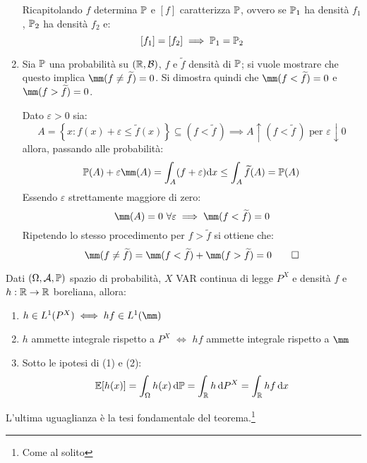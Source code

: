 \begin{dimo}
\begin{enumerate}
      Ricapitolando $f$ determina $\mathbb P$ e $[f]$ caratterizza $\mathbb P$, ovvero se $\mathbb P_1$ ha densità $f_1$, $\mathbb P_2$ ha densità $f_2$ e:
      $$[f_1] = [f_2] \implies \mathbb P_1 = \mathbb P_2$$
    \medskip
    \item Sia $\mathbb P$ una probabilità su $(\mathbb R, \mathcal B)$, $f$ e $\widetilde{f}$ densità di $\mathbb P$;
      si vuole mostrare che questo implica $\mm (f \neq \widetilde{f}) = 0$.
      Si dimostra quindi che $\mm (f < \widetilde{f}) = 0$ e $\mm (f > \widetilde{f}) = 0$.

      Dato $\varepsilon > 0$ sia:
      $$A = \left\{x: f(x)+ \varepsilon \leq \widetilde{f}(x)\right\} \subseteq \left(f < \widetilde{f} \, \right) \implies A \uparrow \left(f  < \widetilde{f} \, \right) \text{ per } \varepsilon \downarrow 0$$
      allora, passando alle probabilità:
      $$\PP(A) + \varepsilon \mm(A) = \int_{A} (f+\varepsilon) \dx \leq \int_{A}  \widetilde{f}(A) = \PP(A)$$
      Essendo $\varepsilon$ strettamente maggiore di zero:
      $$\mm(A) = 0 \ \forall \varepsilon \implies \mm(f < \widetilde{f}) = 0$$
      Ripetendo lo stesso procedimento per $f > \widetilde{f}$ si ottiene che:
      $$\mm(f \neq \widetilde{f}) = \mm(f < \widetilde{f}) + \mm(f > \widetilde{f}) = 0 \qedhere$$
  \end{enumerate}
\end{dimo}

\medskip
\begin{teo}
  Dati $(\Omega, \mathcal A, \mathbb P)$ spazio di probabilità, $X$ VAR continua di legge $P^X$ e densità $f$ e $h: \mathbb R \to \mathbb R$ boreliana, allora:
  \begin{enumerate}
    \item $h \in L^1 (P^X) \iff hf \in L^1(\mm)$
    \item $h$ ammette integrale rispetto a $P^X$ $\iff$ $hf$ ammette integrale rispetto a $\mm$
    \item Sotto le ipotesi di (1) e (2):
    $$\mathbb E[h(x)] = \int_{\Omega} h(x) \, \mathrm d \mathbb P = \int_{\mathbb R} h \, \mathrm d P^X = \int_{\mathbb R} h f \, \mathrm d x$$
  \end{enumerate}
\end{teo}

L'ultima uguaglianza è la tesi fondamentale del teorema.\footnote{Come al solito}
\medskip

